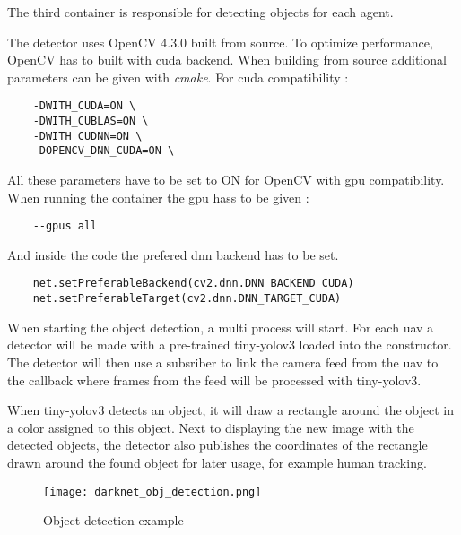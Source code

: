 The third container is responsible for detecting objects for each agent. 

The detector uses OpenCV 4.3.0 built from source. To optimize performance, OpenCV has to built with \acs{cuda} backend. When building from source
additional parameters can be given with \textit{cmake}. For cuda compatibility :

\begin{verbatim}
    -DWITH_CUDA=ON \
    -DWITH_CUBLAS=ON \
    -DWITH_CUDNN=ON \
    -DOPENCV_DNN_CUDA=ON \
\end{verbatim}

All these parameters have to be set to ON for OpenCV with \acs{gpu} compatibility. When running the container the \acs{gpu} hass to be given :

\begin{verbatim}
    --gpus all
\end{verbatim}

And inside the code the prefered dnn backend has to be set. 

\begin{verbatim}
    net.setPreferableBackend(cv2.dnn.DNN_BACKEND_CUDA)
    net.setPreferableTarget(cv2.dnn.DNN_TARGET_CUDA)
\end{verbatim}

When starting the object detection, a multi process will start. 
For each \acs{uav} a detector will be made with a pre-trained tiny-yolov3 loaded into the constructor. 
The detector will then use a subsriber 
to link the camera feed from the \acs{uav} to the callback where frames from the feed will be processed with tiny-yolov3. 

When tiny-yolov3 detects an object, it will draw a rectangle around the object in a color assigned to this object. 
Next to displaying the new image with the detected objects, the detector also publishes 
the coordinates of the rectangle drawn around the found object for later usage, for example human tracking.

\begin{figure}[ht]
    \centering
    \texttt{[image: darknet\_obj\_detection.png]}
    \caption[Object detection example]{Object detection example}
\end{figure}